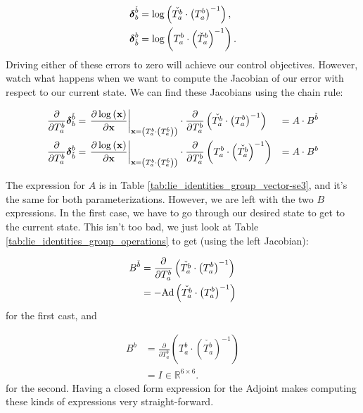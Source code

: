 \begin{align*}
\boldsymbol{\delta}_{b}^{\check{b}} & =\log\left(\check{T_{a}^{b}}\cdot\left(T_{a}^{b}\right)^{-1}\right),\\
\boldsymbol{\delta}_{\check{b}}^{b} & =\log\left(T_{a}^{b}\cdot\left(\check{T}_{a}^{b}\right)^{-1}\right).
\end{align*}
Driving either of these errors to zero will achieve our control objectives.
However, watch what happens when we want to compute the Jacobian of
our error with respect to our current state. We can find these Jacobians
using the chain rule: 

\begin{align*}
\frac{\partial}{\partial T_{a}^{b}}\boldsymbol{\delta}_{b}^{\check{b}} & =\left.\frac{\partial\log\left(\mathbf{x}\right)}{\partial\mathbf{x}}\right|_{\mathbf{x}=\left(T_{a}^{b}\cdot\left(T_{a}^{\check{b}}\right)\right)}\cdot\frac{\partial}{\partial T_{a}^{b}}\left(\check{T_{a}^{b}}\cdot\left(T_{a}^{b}\right)^{-1}\right) & =A\cdot B^{\check{b}}\\
\frac{\partial}{\partial T_{a}^{b}}\boldsymbol{\delta}_{\check{b}}^{b} & =\left.\frac{\partial\log\left(\mathbf{x}\right)}{\partial\mathbf{x}}\right|_{\mathbf{x}=\left(T_{a}^{b}\cdot\left(T_{a}^{\check{b}}\right)\right)}\cdot\frac{\partial}{\partial T_{a}^{b}}\left(T_{a}^{b}\cdot\left(\check{T_{a}^{b}}\right)^{-1}\right) & =A\cdot B^{b}
\end{align*}

The expression for $A$ is in Table \ref{tab:lie_identities_group_vector-se3},
and it's the same for both parameterizations. However, we are left
with the two $B$ expressions. In the first case, we have to go through
our desired state to get to the current state. This isn't too bad,
we just look at Table \ref{tab:lie_identities_group_operations} to
get (using the left Jacobian):

\begin{align*}
B^{\check{b}} & =\frac{\partial}{\partial T_{a}^{b}}\left(\check{T_{a}^{b}}\cdot\left(T_{a}^{b}\right)^{-1}\right)\\
 & =-\textnormal{Ad}\left(\check{T_{a}^{b}}\cdot\left(T_{a}^{b}\right)^{-1}\right)
\end{align*}
for the first cast, and

\begin{align*}
B^{b} & =\frac{\partial}{\partial T_{a}^{b}}\left(T_{a}^{b}\cdot\left(\check{T_{a}^{b}}\right)^{-1}\right)\\
 & =I\in\mathbb{R}^{6\times6}.
\end{align*}
for the second. Having a closed form expression for the Adjoint makes
computing these kinds of expressions very straight-forward. 

